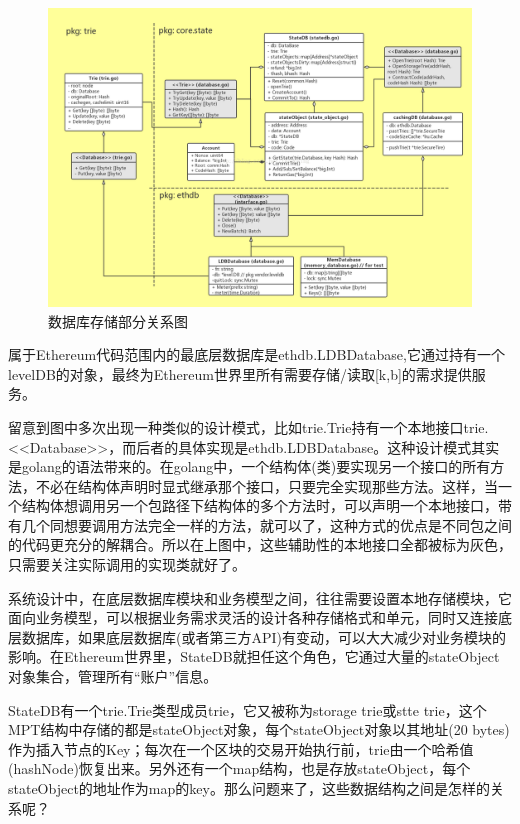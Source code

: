 \documentclass[UTF8]{ctexart}
\begin{document}
\begin{figure}
	\centering
	\includegraphics[scale=0.3]{store.png}
	\caption{数据库存储部分关系图}
	\label{store}
\end{figure}

属于Ethereum代码范围内的最底层数据库是ethdb.LDBDatabase,它通过持有一个levelDB的对象，最终为Ethereum世界里所有需要存储/读取[k,b]的需求提供服务。

留意到图中多次出现一种类似的设计模式，比如trie.Trie持有一个本地接口trie.<<Database>>，而后者的具体实现是ethdb.LDBDatabase。这种设计模式其实是golang的语法带来的。在golang中，一个结构体(类)要实现另一个接口的所有方法，不必在结构体声明时显式继承那个接口，只要完全实现那些方法。这样，当一个结构体想调用另一个包路径下结构体的多个方法时，可以声明一个本地接口，带有几个同想要调用方法完全一样的方法，就可以了，这种方式的优点是不同包之间的代码更充分的解耦合。所以在上图中，这些辅助性的本地接口全都被标为灰色，只需要关注实际调用的实现类就好了。

系统设计中，在底层数据库模块和业务模型之间，往往需要设置本地存储模块，它面向业务模型，可以根据业务需求灵活的设计各种存储格式和单元，同时又连接底层数据库，如果底层数据库(或者第三方API)有变动，可以大大减少对业务模块的影响。在Ethereum世界里，StateDB就担任这个角色，它通过大量的stateObject对象集合，管理所有“账户”信息。


StateDB有一个trie.Trie类型成员trie，它又被称为storage trie或stte trie，这个MPT结构中存储的都是stateObject对象，每个stateObject对象以其地址(20 bytes)作为插入节点的Key；每次在一个区块的交易开始执行前，trie由一个哈希值(hashNode)恢复出来。另外还有一个map结构，也是存放stateObject，每个stateObject的地址作为map的key。那么问题来了，这些数据结构之间是怎样的关系呢？
\end{document}
